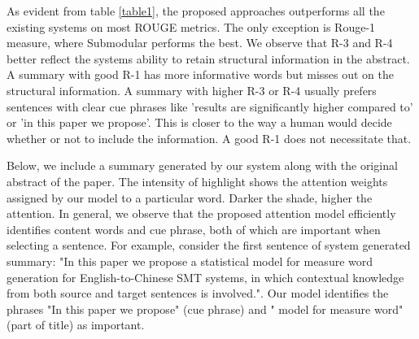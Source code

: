 As evident from table \ref{table1}, the proposed approaches outperforms all the existing systems on most ROUGE metrics. The only exception is Rouge-1 measure, where Submodular performs the best. We observe that R-3 and R-4 better reflect the systems ability to retain structural information in the abstract. A summary with good R-1 has more informative words but misses out on the structural information. A summary with higher R-3 or R-4 usually prefers sentences with clear cue phrases like 'results are significantly higher compared to' or 'in this paper we propose'. This is closer to the way a human would decide whether or not to include the information. A good R-1 does not necessitate that.

Below, we include a summary generated by our system along with the original abstract of the paper. The intensity of highlight shows the attention weights assigned by our model to a particular word. Darker the shade, higher the attention. In general, we observe that the proposed attention model efficiently identifies content words and cue phrase, both of which are important when selecting a sentence. For example, consider the first sentence of system generated summary: "In this paper we propose a statistical model for measure word generation for English-to-Chinese SMT systems, in which contextual knowledge from both source and target sentences is involved.". Our model identifies the phrases "In this paper we propose" (cue phrase) and " model for measure word" (part of title) as important. 
\vspace{-2mm}
